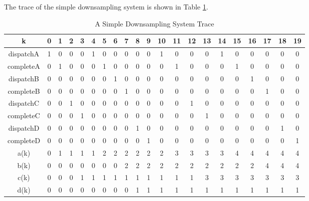 The trace of the simple downsampling system is shown in Table \ref{tab:table1}.
\begin{table}[h!]
\begin{center}
\caption{A Simple Downsampling System Trace}
\label{tab:table1}
\begin{tabular}{ |c|c|c|c|c|c|c|c|c|c|c|c|c|c|c|c|c|c|c|c|c|} 
\hline
            k & 0 & 1 & 2 & 3 & 4 & 5 & 6 & 7 & 8 & 9 & 10  & 11 & 12 & 13 & 14 & 15 & 16 & 17 & 18 & 19 \\
\hline
dispatchA  & 1 & 0 & 0 & 0 & 1 & 0 & 0 & 0 & 0 & 0 & 1 & 0 & 0 & 0 & 1 & 0 & 0 & 0 & 0 & 0  \\ 
\hline
completeA & 0 & 1 & 0 & 0 & 0 & 1 & 0 & 0 & 0 & 0 & 0 & 1 & 0 & 0 & 0 & 1 & 0 & 0 & 0 & 0  \\ 
\hline
dispatchB & 0 & 0 & 0 & 0 & 0 & 0 & 1 & 0 & 0 & 0 & 0 & 0 & 0 & 0 & 0 & 0 & 1 & 0 & 0 & 0  \\ 
\hline
completeB & 0 & 0 & 0 &0 & 0 & 0 & 0 & 1 & 0 & 0 & 0 & 0 & 0 & 0 & 0 & 0 & 0 & 1 & 0 & 0 \\ 
\hline
dispatchC & 0 & 0 & 1 & 0 & 0 & 0 & 0 & 0 & 0 & 0 & 0 & 0 & 1 & 0 & 0 & 0 & 0 & 0 & 0 & 0  \\ 
\hline
completeC & 0 & 0 & 0 & 1  & 0 & 0 & 0 & 0 & 0 & 0 & 0 & 0 & 0 & 1 & 0 & 0 & 0 & 0 & 0 & 0 \\ 
\hline
dispatchD & 0 & 0 & 0 & 0 & 0 & 0 & 0 & 0 & 1 & 0 & 0 & 0 & 0 & 0 & 0 & 0 & 0 & 0 & 1 & 0 \\ 
\hline
completeD & 0 & 0 & 0 & 0  & 0 & 0 & 0 & 0 & 0 & 1 & 0 & 0 & 0 & 0 & 0 & 0 & 0 & 0 & 0 & 1 \\ 
\hline
a(k) & 0 & 1 & 1 & 1 & 1 & 2 & 2 & 2 & 2 & 2 & 2 & 3 & 3 & 3 & 3 & 4 & 4 & 4 & 4 & 4 \\
\hline
b(k) & 0 & 0 & 0 & 0 & 0 & 0 & 0 & 2 & 2 & 2 & 2 & 2 & 2 & 2 & 2 & 2 & 2 & 4 & 4 & 4 \\
\hline
c(k) & 0 & 0 & 0 & 1 & 1 & 1 & 1 & 1 & 1 & 1 & 1 & 1 & 1 & 3 & 3 & 3 & 3 & 3 & 3 & 3 \\
\hline
d(k) & 0 & 0 & 0 & 0 & 0 & 0 & 0 & 0 & 1 & 1 & 1 & 1 & 1 & 1 & 1 & 1 & 1 & 1 & 1 & 1 \\
\hline
\end{tabular}
\end{center}
\end{table}